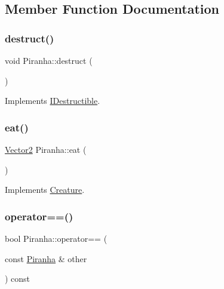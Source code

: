 \subsection{Member Function Documentation}
\mbox{\label{class_piranha_a79c586a13bed4fb4aaa1b99c41c93c5a}} 
\subsubsection{\texorpdfstring{destruct()}{destruct()}}
{\footnotesize\ttfamily void Piranha\+::destruct (\begin{DoxyParamCaption}{ }\end{DoxyParamCaption})\hspace{0.3cm}{\ttfamily [virtual]}}



Implements \mbox{\hyperlink{class_i_destructible_a63016d1bb4daa0a726fc8add9a0be62d}{I\+Destructible}}.

\mbox{\label{class_piranha_a125847235bdbd0e8c676dcada0d86c14}} 
\subsubsection{\texorpdfstring{eat()}{eat()}}
{\footnotesize\ttfamily \mbox{\hyperlink{struct_vector2}{Vector2}} Piranha\+::eat (\begin{DoxyParamCaption}{ }\end{DoxyParamCaption})\hspace{0.3cm}{\ttfamily [virtual]}}



Implements \mbox{\hyperlink{class_creature_a0d531a4c04c1021833ddb0e48864dbf4}{Creature}}.

\mbox{\label{class_piranha_ad374828e737e57a663689f5d54c9cf14}} 
\subsubsection{\texorpdfstring{operator==()}{operator==()}}
{\footnotesize\ttfamily bool Piranha\+::operator== (\begin{DoxyParamCaption}\item[{const \mbox{\hyperlink{class_piranha}{Piranha}} \&}]{other }\end{DoxyParamCaption}) const}



